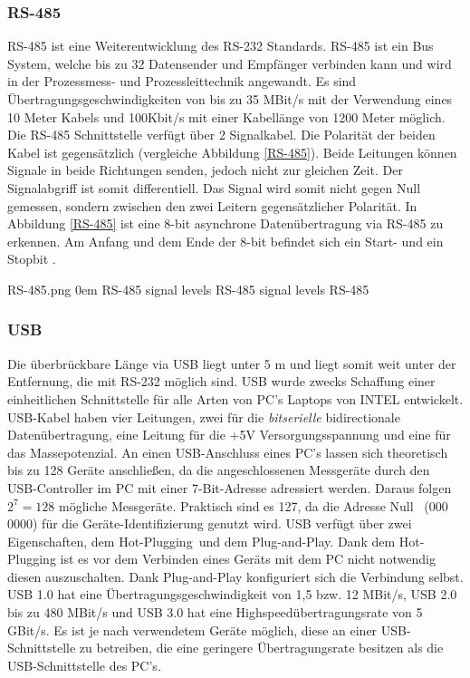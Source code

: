 \subsubsection{RS-485}

RS-485 ist eine Weiterentwicklung des RS-232 Standards. RS-485 ist ein Bus System, welche bis zu 32 Datensender und Empfänger verbinden kann und wird in der Prozessmess- und Prozessleittechnik angewandt. Es sind Übertragungsgeschwindigkeiten von bis zu 35 MBit/s mit der Verwendung eines 10 Meter Kabels und 100Kbit/s mit einer Kabellänge von 1200 Meter möglich. Die RS-485 Schnittstelle verfügt über 2 Signalkabel. Die Polarität der beiden Kabel ist gegensätzlich (vergleiche Abbildung \ref{RS-485}). Beide Leitungen können Signale in beide Richtungen senden, jedoch nicht zur gleichen Zeit. Der Signalabgriff ist somit differentiell. Das Signal wird somit nicht gegen Null gemessen, sondern zwischen den zwei Leitern gegensätzlicher Polarität. In Abbildung \ref{RS-485} ist eine 8-bit asynchrone Datenübertragung via RS-485 zu erkennen. Am Anfang und dem Ende der 8-bit befindet sich ein Start- und ein Stopbit \cite[S. 222 f.]{hughes2010real}.


{RS-485.png}
{0em}
{RS-485 signal levels}
{RS-485 signal levels \cite[S. 226]{hughes2010real}}
{RS-485}

\subsubsection{USB}

Die überbrückbare Länge via USB liegt unter 5 m und liegt somit weit unter der Entfernung, die mit RS-232 möglich sind. USB wurde zwecks Schaffung einer einheitlichen Schnittstelle für alle Arten von PC's Laptops von INTEL entwickelt. USB-Kabel haben vier Leitungen, zwei für die \textit{bitserielle} bidirectionale Datenübertragung, eine Leitung für die +5V Versorgungsspannung und eine für das Massepotenzial. An einen USB-Anschluss eines PC's lassen sich theoretisch bis zu 128 Geräte anschließen, da die angeschlossenen Messgeräte durch den USB-Controller im PC mit einer 7-Bit-Adresse adressiert werden. Daraus folgen $2^7=128$ mögliche Messgeräte. Praktisch sind es 127, da die Adresse \glqq Null \grqq \, (000 0000) für die Geräte-Identifizierung genutzt wird. USB verfügt über zwei Eigenschaften, dem \glqq Hot-Plugging\grqq \, und dem \glqq Plug-and-Play\grqq . Dank dem Hot-Plugging ist es vor dem Verbinden eines Geräts mit dem PC nicht notwendig diesen auszuschalten. Dank Plug-and-Play konfiguriert sich die Verbindung selbst. USB 1.0 hat eine Übertragungsgeschwindigkeit von 1,5 bzw. 12 MBit/s, USB 2.0 bis zu 480 MBit/s und USB 3.0 hat eine Highspeedübertragungsrate von 5 GBit/s. Es ist je nach verwendetem Geräte möglich, diese an einer USB-Schnittstelle zu betreiben, die eine geringere Übertragungsrate besitzen als die USB-Schnittstelle des PC's.

